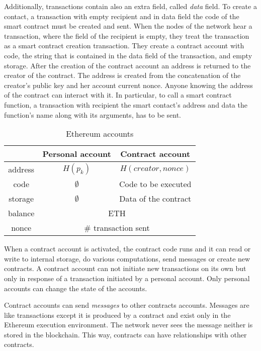 Additionally, transactions contain also an extra field, called \textit{data} field. To create a contact, a transaction with empty recipient and in data field the code of the smart contract must be created and sent. When the nodes of the network hear a transaction, where the field of the recipient is empty, they treat the transaction as a smart contract creation transaction. They create a contract account with code, the string that is contained in the data field of the transaction, and empty storage. After the creation of the contract account an address is returned to the creator of the contract. The address is created from the concatenation of the creator's public key and her account current nonce. Anyone knowing the address of the contract can interact with it. In particular, to call a smart contract function, a transaction with recipient the smart contact's address and data the function's name along with its arguments, has to be sent.

\begin{table}[!ht]
  \centering
  \caption{Ethereum accounts}
  \begin{tabular}{|c|c|c|}
  \hline
   & Personal account  & Contract account \\ \hline
   address & $H(p_k)$ & $H(creator, nonce)$ \\ \hline
   code & $\emptyset$ & Code to be executed \\ \hline
   storage & $\emptyset$ & Data of the contract \\ \hline
   balance & \multicolumn{2}{c|}{ETH} \\ \hline
   nonce &  \multicolumn{2}{c|}{\# transaction sent}  \\ \hline
  \end{tabular}
  \label{fig:eth_accounts}
\end{table}

When a contract account is activated, the contract code runs and it can read or write to internal storage, do various computations, send messages or create new contracts. A contract account can not initiate new transactions on its own but only in response of a transaction initiated by a personal account. Only personal accounts can change the state of the accounts.

Contract accounts can send \textit{messages} to other contracts accounts. Messages are like transactions except it is produced by a contract and exist only in the Ethereum execution environment. The network never sees the message neither is stored in the blockchain. This way, contracts can have relationships with other contracts.

